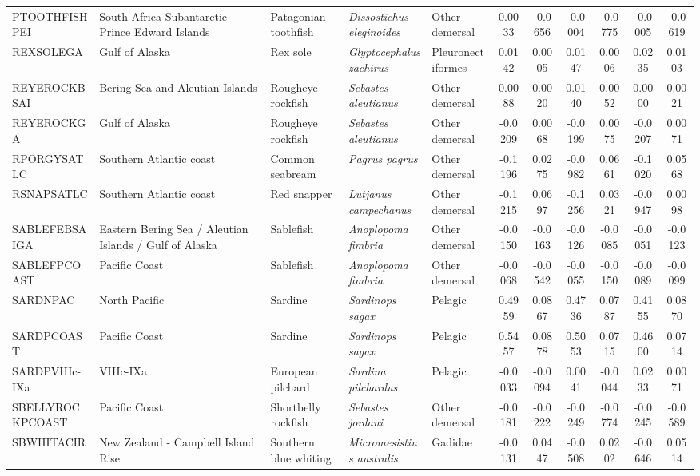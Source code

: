 \begin{longtable}{p{3cm}p{3cm}lllcccccc}
  PTOOTHFISHPEI & South Africa Subantarctic Prince Edward Islands & Patagonian toothfish & \textit{Dissostichus eleginoides} & Other demersal & 0.0033 & -0.0656 & -0.0004 & -0.0775 & -0.0005 & -0.0619 \\
  REXSOLEGA & Gulf of Alaska & Rex sole & \textit{Glyptocephalus zachirus} & Pleuronectiformes & 0.0142 & 0.0005 & 0.0147 & 0.0006 & 0.0235 & 0.0103 \\
  REYEROCKBSAI & Bering Sea and Aleutian Islands & Rougheye rockfish & \textit{Sebastes aleutianus} & Other demersal & 0.0088 & 0.0020 & 0.0140 & 0.0052 & 0.0000 & 0.0021 \\
  REYEROCKGA & Gulf of Alaska & Rougheye rockfish & \textit{Sebastes aleutianus} & Other demersal & -0.0209 & 0.0068 & -0.0199 & 0.0075 & -0.0207 & 0.0071 \\
  RPORGYSATLC & Southern Atlantic coast & Common seabream & \textit{Pagrus pagrus} & Other demersal & -0.1196 & 0.0275 & -0.0982 & 0.0661 & -0.1020 & 0.0568 \\
  RSNAPSATLC & Southern Atlantic coast & Red snapper & \textit{Lutjanus campechanus} & Other demersal & -0.1215 & 0.0697 & -0.1256 & 0.0321 & -0.0947 & 0.0098 \\
  SABLEFEBSAIGA & Eastern Bering Sea / Aleutian Islands / Gulf of Alaska & Sablefish & \textit{Anoplopoma fimbria} & Other demersal & -0.0150 & -0.0163 & -0.0126 & -0.0085 & -0.0051 & -0.0123 \\
  SABLEFPCOAST & Pacific Coast & Sablefish & \textit{Anoplopoma fimbria} & Other demersal & -0.0068 & -0.0542 & -0.0055 & -0.0150 & -0.0089 & -0.0099 \\
  SARDNPAC & North Pacific & Sardine & \textit{Sardinops sagax} & Pelagic & 0.4959 & 0.0867 & 0.4736 & 0.0787 & 0.4155 & 0.0870 \\
  SARDPCOAST & Pacific Coast & Sardine & \textit{Sardinops sagax} & Pelagic & 0.5457 & 0.0878 & 0.5053 & 0.0715 & 0.4600 & 0.0714 \\
  SARDPVIIIc-IXa & VIIIc-IXa & European pilchard & \textit{Sardina pilchardus} & Pelagic & -0.0033 & -0.0094 & 0.0041 & -0.0044 & 0.0233 & 0.0071 \\
  SBELLYROCKPCOAST & Pacific Coast & Shortbelly rockfish & \textit{Sebastes jordani} & Other demersal & -0.0181 & -0.0222 & -0.0249 & -0.0774 & -0.0245 & -0.0589 \\
  SBWHITACIR & New Zealand - Campbell Island Rise & Southern blue whiting & \textit{Micromesistius australis} & Gadidae & -0.0131 & 0.0447 & -0.0508 & 0.0202 & -0.0646 & 0.0514 \\

\end{longtable}

